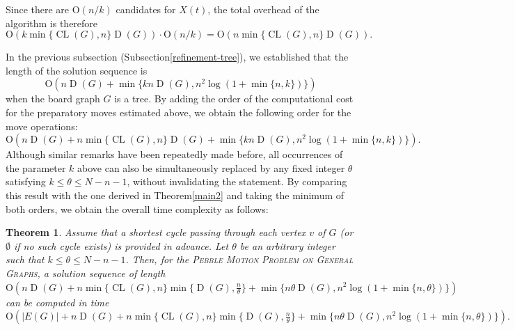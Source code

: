 \documentclass[letter,11pt]{article}
\newtheorem{thm}{Theorem}
\theoremstyle{definition}
\theoremstyle{definition}
\DeclareMathOperator{\D}{D}
\DeclareMathOperator{\CL}{CL}
\newcommand{\1}{\boldmath$~1~$\unboldmath}
\newcommand{\Ord}{\mathrm{O}}
\newcommand{\tume}{\hspace*{0.2em}}
\begin{document}
Since there are $\Ord(n/k)$ candidates for $X(t)$, 
the total overhead of the algorithm is therefore
$$\Ord(k\min\{\CL(G),n\}\D(G)) \cdot \Ord(n/k) = \Ord(n\min\{\CL(G),n\}\D(G)).$$


In the previous subsection (Subsection\tume\ref{refinement-tree}), we established 
that the length of the solution sequence is 
$$
\Ord(n\D(G) + \min\{kn\D(G), n^2 \log(1+\min\{n, k\})\})
$$
when the board graph $G$ is a tree.
By adding the order of the computational cost for the preparatory moves estimated above, 
we obtain the following order for the move operations:
$$
\Ord(n\D(G) + n \min\{\CL(G), n\} \D(G) + \min\{kn \D(G), n^2 \log(1+\min\{n, k\})\}).
$$
Although similar remarks have been repeatedly made before, all occurrences of the parameter $k$ 
above can also be simultaneously replaced by any fixed integer $\theta$ satisfying $k \leq \theta \leq N - n - 1$, 
without invalidating the statement.
By comparing this result with the one derived in Theorem\tume\ref{main2} and taking the minimum of 
both orders, we obtain the overall time complexity as follows:
\begin{thm}\label{refinement2}
Assume that a shortest cycle passing through each vertex $v$ of $G$ (or $\emptyset$ if no such cycle exists) 
is provided in advance.
Let $\theta$ be an arbitrary integer such that $k \leq \theta \leq N-n-1$.
Then, for the \textsc{Pebble Motion Problem on General Graphs}, a solution sequence of length
$\Ord(n\D(G) + n \min\{\CL(G), n\} \min\{\D(G), \frac{n}{\theta}\} + \min\{n\theta\D(G), n^2 \log(1+\min\{n, \theta\})\})$
can be computed in time 
$\Ord(|E(G)| + n\D(G)+n \min\{\CL(G), n\} \min\{\D(G), \frac{n}{\theta}\} + \min\{n\theta\D(G), n^2 \log(1+\min\{n, \theta\})\}).$
\end{thm}
\end{document}
